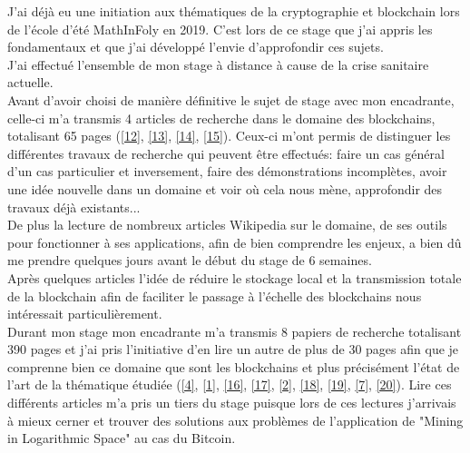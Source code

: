 \documentclass[12pt,a4paper]{article}
\newcommand{\source}[1]{\hyperlink{#1}{[#1]}}
\begin{document}
	J'ai déjà eu une initiation aux thématiques de la cryptographie et blockchain lors de l'école d'été MathInFoly en 2019. C'est lors de ce stage que j'ai appris les fondamentaux et que j'ai développé l'envie d'approfondir ces sujets.\\ %
	
	J'ai effectué l'ensemble de mon stage à distance à cause de la crise sanitaire actuelle.\\
	Avant d'avoir choisi de manière définitive le sujet de stage avec mon encadrante, celle-ci m'a transmis 4 articles de recherche dans le domaine des blockchains, totalisant 65 pages (\source{12}, \source{13}, \source{14}, \source{15}). Ceux-ci m'ont permis de distinguer les différentes travaux de recherche qui peuvent être effectués: faire un cas général d'un cas particulier et inversement, faire des démonstrations incomplètes, avoir une idée nouvelle dans un domaine et voir où cela nous mène, approfondir des travaux déjà existants...\\

	De plus la lecture de nombreux articles Wikipedia sur le domaine, de ses outils pour fonctionner à ses applications, afin de bien comprendre les enjeux, a bien dû me prendre quelques jours avant le début du stage de 6 semaines.\\%
	Après quelques articles l'idée de réduire le stockage local et la transmission totale de la blockchain afin de faciliter le passage à l'échelle des blockchains nous intéressait particulièrement.\\
	
	Durant mon stage mon encadrante m'a transmis 8 papiers de recherche totalisant 390 pages et j'ai pris l'initiative d'en lire un autre de plus de 30 pages afin que je comprenne bien ce domaine que sont les blockchains et plus précisément l'état de l'art de la thématique étudiée (\source{4}, \source{1}, \source{16}, \source{17}, \source{2}, \source{18}, \source{19}, \source{7}, \source{20}). Lire ces différents articles m'a pris un tiers du stage puisque lors de ces lectures j'arrivais à mieux cerner et trouver des solutions aux problèmes de l'application de "Mining in Logarithmic Space" au cas du Bitcoin.\\
	
\end{document}
